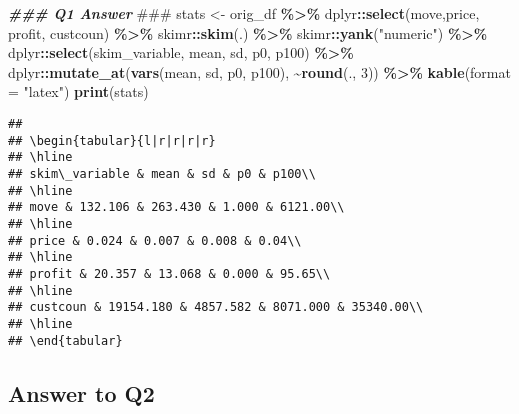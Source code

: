 \documentclass[
]{article}
\newenvironment{Shaded}{\begin{snugshade}}{\end{snugshade}}
\newcommand{\AlertTok}[1]{\textcolor[rgb]{0.94,0.16,0.16}{#1}}
\newcommand{\AttributeTok}[1]{\textcolor[rgb]{0.13,0.29,0.53}{#1}}
\newcommand{\DecValTok}[1]{\textcolor[rgb]{0.00,0.00,0.81}{#1}}
\newcommand{\DocumentationTok}[1]{\textcolor[rgb]{0.56,0.35,0.01}{\textbf{\textit{#1}}}}
\newcommand{\FunctionTok}[1]{\textcolor[rgb]{0.13,0.29,0.53}{\textbf{#1}}}
\newcommand{\NormalTok}[1]{#1}
\newcommand{\OtherTok}[1]{\textcolor[rgb]{0.56,0.35,0.01}{#1}}
\newcommand{\SpecialCharTok}[1]{\textcolor[rgb]{0.81,0.36,0.00}{\textbf{#1}}}
\newcommand{\StringTok}[1]{\textcolor[rgb]{0.31,0.60,0.02}{#1}}
\begin{document}
\begin{Shaded}
\begin{Highlighting}[]
\DocumentationTok{\#\#\# Q1 Answer }\AlertTok{\#\#\#}
\NormalTok{stats }\OtherTok{\textless{}{-}}\NormalTok{ orig\_df }\SpecialCharTok{\%\textgreater{}\%}
\NormalTok{  dplyr}\SpecialCharTok{::}\FunctionTok{select}\NormalTok{(move,price, profit, custcoun) }\SpecialCharTok{\%\textgreater{}\%}
\NormalTok{  skimr}\SpecialCharTok{::}\FunctionTok{skim}\NormalTok{(.) }\SpecialCharTok{\%\textgreater{}\%}
\NormalTok{  skimr}\SpecialCharTok{::}\FunctionTok{yank}\NormalTok{(}\StringTok{"numeric"}\NormalTok{) }\SpecialCharTok{\%\textgreater{}\%}
\NormalTok{  dplyr}\SpecialCharTok{::}\FunctionTok{select}\NormalTok{(skim\_variable, mean, sd, p0, p100) }\SpecialCharTok{\%\textgreater{}\%}
\NormalTok{  dplyr}\SpecialCharTok{::}\FunctionTok{mutate\_at}\NormalTok{(}\FunctionTok{vars}\NormalTok{(mean, sd, p0, p100), }\SpecialCharTok{\textasciitilde{}}\FunctionTok{round}\NormalTok{(., }\DecValTok{3}\NormalTok{)) }\SpecialCharTok{\%\textgreater{}\%}
  \FunctionTok{kable}\NormalTok{(}\AttributeTok{format =} \StringTok{"latex"}\NormalTok{)}
\FunctionTok{print}\NormalTok{(stats)}
\end{Highlighting}
\end{Shaded}

\begin{verbatim}
## 
## \begin{tabular}{l|r|r|r|r}
## \hline
## skim\_variable & mean & sd & p0 & p100\\
## \hline
## move & 132.106 & 263.430 & 1.000 & 6121.00\\
## \hline
## price & 0.024 & 0.007 & 0.008 & 0.04\\
## \hline
## profit & 20.357 & 13.068 & 0.000 & 95.65\\
## \hline
## custcoun & 19154.180 & 4857.582 & 8071.000 & 35340.00\\
## \hline
## \end{tabular}
\end{verbatim}

\hypertarget{answer-to-q2}{%
\subsection{Answer to Q2}\label{answer-to-q2}}
\end{document}
